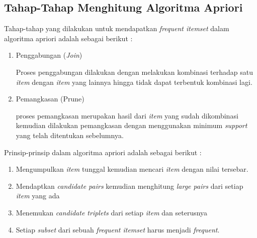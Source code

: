 \subsection{Tahap-Tahap Menghitung Algoritma Apriori}
Tahap-tahap yang dilakukan untuk mendapatkan \textit{frequent itemset} dalam algoritma apriori adalah sebagai berikut \cite{triyanto2014association}:
 \begin{enumerate}
\item Penggabungan (\textit{Join})
\par Proses penggabungan dilakukan dengan melakukan kombinasi terhadap satu \textit{item} dengan \textit{item} yang lainnya hingga tidak dapat terbentuk kombinasi lagi.
\item Pemangkasan (Prune)
\par proses pemangkasan merupakan hasil dari \textit{item} yang sudah dikombinasi kemudian dilakukan pemangkasan dengan menggunakan minimum \textit{support} yang telah ditentukan sebelumnya. 
\end{enumerate}

\par Prinsip-prinsip dalam algoritma apriori adalah sebagai berikut \cite{tampubolon2013implementasi}:
 \begin{enumerate}
\item Mengumpulkan \textit{item} tunggal kemudian mencari \textit{item} dengan nilai tersebar.
\item Mendaptkan \textit{candidate pairs} kemudian menghitung \textit{large pairs} dari setiap \textit{item} yang ada
\item Menemukan \textit{candidate triplets} dari setiap \textit{item} dan seterusnya
\item Setiap \textit{subset} dari sebuah \textit{frequent itemset} harus menjadi \textit{frequent}.
\end{enumerate}

